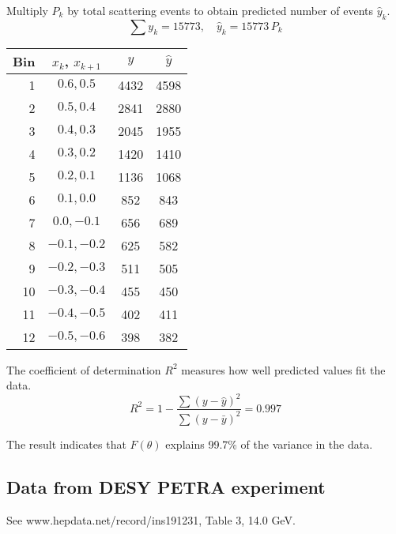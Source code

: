 \documentclass[12pt]{article}
\begin{document}
Multiply $P_k$ by total scattering events to obtain predicted number of events $\hat{y}_k$.
\begin{equation*}
\sum y_k=15773,\quad \hat{y}_k=15773\,P_k
\end{equation*}

\begin{center}
\begin{tabular}{|r|c|c|c|}
\hline
Bin & $x_k$, $x_{k+1}$ & $y$ & $\hat{y}$ \\
\hline
1 & $0.6, 0.5$ & 4432 & 4598\\
2 & $0.5, 0.4$ & 2841 & 2880\\
3 & $0.4, 0.3$ & 2045 & 1955\\
4 & $0.3, 0.2$ & 1420 & 1410\\
5 & $0.2, 0.1$ & 1136 & 1068\\
6 & $0.1, 0.0$ & 852 & 843\\
7 & $0.0, -0.1$ & 656 & 689\\
8 & $-0.1, -0.2$ & 625 & 582\\
9 & $-0.2, -0.3$ & 511 & 505\\
10 & $-0.3, -0.4$ & 455 & 450\\
11 & $-0.4, -0.5$ & 402 & 411\\
12 & $-0.5, -0.6$ & 398 & 382\\
\hline
\end{tabular}
\end{center}

The coefficient of determination $R^2$ measures how well predicted values fit the data.
\begin{equation*}
R^2=1-\frac{\sum(y-\hat{y})^2}{\sum(y-\bar{y})^2}=0.997
\end{equation*}

The result indicates that $F(\theta)$ explains
99.7\% of the variance in the data.

\subsection*{Data from DESY PETRA experiment}
See www.hepdata.net/record/ins191231, Table 3, 14.0 GeV.
\end{document}

